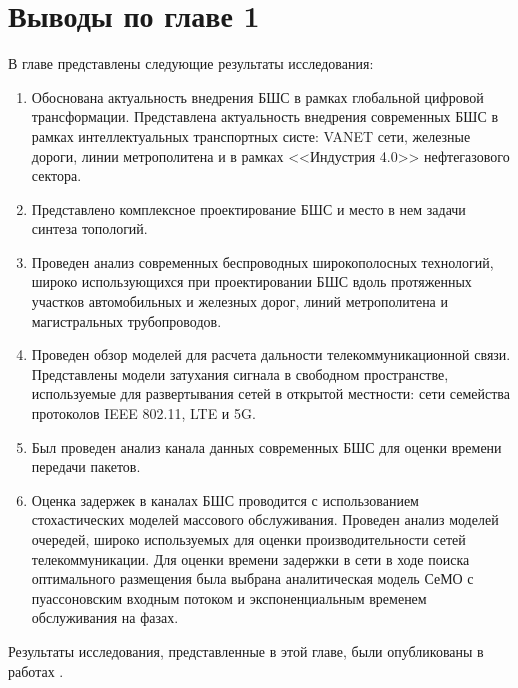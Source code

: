 \section{Выводы по главе 1}
 
В главе представлены следующие результаты исследования:

\begin{enumerate}
  \item Обоснована актуальность внедрения БШС в рамках глобальной цифровой трансформации. Представлена актуальность внедрения современных БШС в рамках интеллектуальных транспортных систе: VANET сети, железные дороги, линии метрополитена и в рамках <<Индустрия 4.0>> нефтегазового сектора.
  \item Представлено комплексное проектирование БШС и место в нем задачи синтеза топологий. 
  \item Проведен анализ современных беспроводных широкополосных технологий, широко использующихся при проектировании БШС вдоль протяженных участков автомобильных и железных дорог, линий метрополитена и магистральных трубопроводов.
  \item Проведен обзор моделей для расчета дальности телекоммуникационной связи. Представлены модели затухания сигнала в свободном пространстве, используемые для развертывания сетей в открытой местности: сети семейства протоколов IEEE 802.11, LTE и 5G.
  \item Был проведен анализ канала данных современных БШС для оценки времени передачи пакетов.
  \item Оценка задержек в каналах БШС проводится с использованием стохастических моделей массового обслуживания. Проведен анализ моделей очередей, широко используемых для оценки производительности сетей телекоммуникации. Для оценки времени задержки в сети в ходе поиска оптимального размещения была выбрана аналитическая модель СеМО с пуассоновским входным потоком и экспоненциальным временем обслуживания на фазах.
\end{enumerate}

Результаты исследования, представленные в этой главе, были опубликованы в работах \cite{Larionov2021, LazarevaLarionovMukhtarovITTMM2020_RSCI, VishnevskyLarionovMukhtarovICAM2020_RSCI, }.











\FloatBarrier
